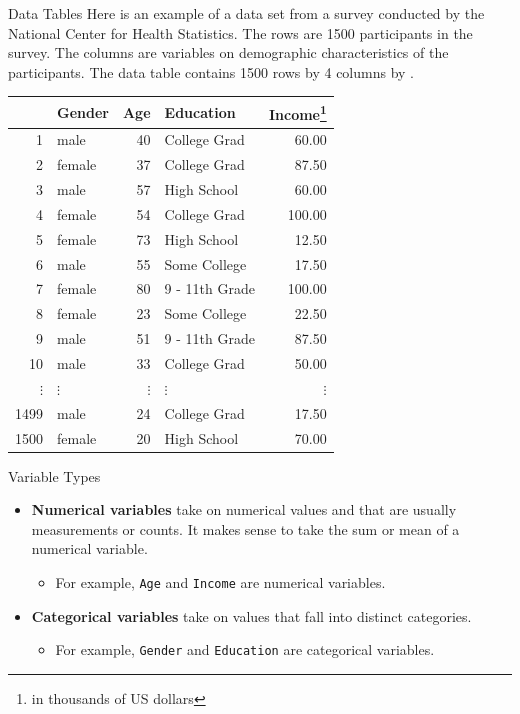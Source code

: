 \documentclass[10pt]{beamer}
\begin{document}
\begin{frame}[fragile]{Data Tables}
Here is an example of a data set from a survey conducted by the National Center for Health Statistics.  The rows are 1500 participants in the survey.  The columns are variables on demographic characteristics of the participants.  The data table contains 1500 rows by 4 columns by .

\small
\begin{table}[ht]
\centering
\begin{tabular}{rlrlr}
  \hline
 & Gender & Age & Education & Income\footnote{in thousands of US dollars}\\ 
  \hline
1 & male &  40 & College Grad & 60.00 \\ 
  2 & female &  37 & College Grad & 87.50 \\ 
  3 & male &  57 & High School & 60.00 \\ 
  4 & female &  54 & College Grad & 100.00 \\ 
  5 & female &  73 & High School & 12.50 \\ 
  6 & male &  55 & Some College & 17.50 \\ 
  7 & female &  80 & 9 - 11th Grade & 100.00 \\ 
  8 & female &  23 & Some College & 22.50 \\ 
  9 & male &  51 & 9 - 11th Grade & 87.50 \\ 
  10 & male &  33 & College Grad & 50.00 \\
  $\vdots$ & $\vdots$ &  $\vdots$ & $\vdots$ & $\vdots$ \\
  1499 & male &  24 & College Grad & 17.50 \\ 
  1500 & female &  20 & High School & 70.00 \\ 
   \hline
\end{tabular}
\end{table}
\end{frame}


\begin{frame}{Variable Types}
\vspace{-2.5cm}
\begin{itemize}
\item \textbf{Numerical variables} take on numerical values and that are usually measurements or counts.  It makes sense to take the sum or mean of a numerical variable.  
\begin{itemize}
\item For example, \texttt{Age} and \texttt{Income} are numerical variables.
\end{itemize}
\vspace{10pt}  
\item \textbf{Categorical variables} take on values that fall into distinct categories.  
\begin{itemize}
\item For example, \texttt{Gender} and \texttt{Education} are categorical variables.
\end{itemize}
\end{itemize}
\end{frame}
\end{document}
